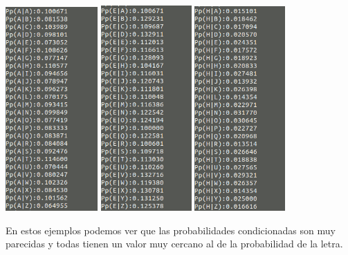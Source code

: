 \documentclass{apuntes}
\begin{document}
\begin{center}
	\includegraphics[width=100pt]{ProbA.png}
	\includegraphics[width=98pt]{ProbE.png}
	\includegraphics[width=98pt]{ProbH.png}
\end{center}

En estos ejemplos podemos ver que las probabilidades condicionadas son muy parecidas y todas tienen un valor muy cercano al de la probabilidad de la letra.
\end{document}
